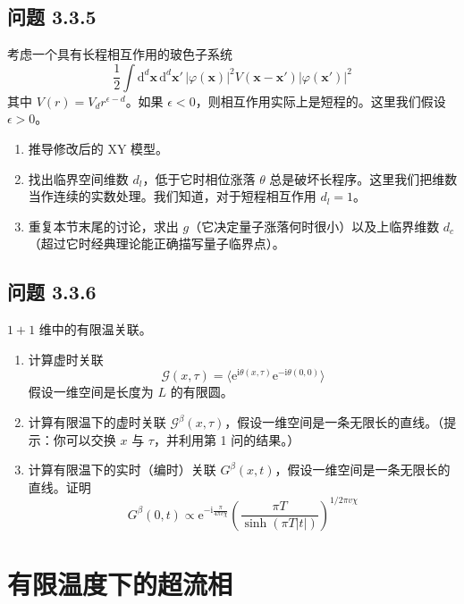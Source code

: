 \subsection*{问题 3.3.5}

考虑一个具有长程相互作用的玻色子系统
\begin{equation*}
\frac{1}{2}\int\mathrm{d}^d\pmb{x}\,\mathrm{d}^d\pmb{x}'\,|\varphi(\pmb{x})|^2V(\pmb{x}-\pmb{x}')|\varphi(\pmb{x}')|^2
\end{equation*}
其中 $V(r)=V_dr^{\epsilon-d}$。如果 $\epsilon<0$，则相互作用实际上是短程的。这里我们假设 $\epsilon>0$。
\begin{enumerate}
\item 推导修改后的 XY 模型。
\item 找出临界空间维数 $d_l$，低于它时相位涨落 $\theta$ 总是破坏长程序。这里我们把维数当作连续的实数处理。我们知道，对于短程相互作用 $d_l=1$。
\item 重复本节末尾的讨论，求出 $g$（它决定量子涨落何时很小）以及上临界维数 $d_c$（超过它时经典理论能正确描写量子临界点）。
\end{enumerate}

\subsection*{问题 3.3.6}

$1+1$ 维中的有限温关联。
\begin{enumerate}
\item 计算虚时关联
\begin{equation*}
\mathcal{G}(x,\tau)=\big\langle\mathrm{e}^{\mathrm{i}\theta(x,\tau)}\mathrm{e}^{-\mathrm{i}\theta(0,0)}\big\rangle
\end{equation*}
假设一维空间是长度为 $L$ 的有限圆。
\item 计算有限温下的虚时关联 $\mathcal{G}^{\beta}(x,\tau)$，假设一维空间是一条无限长的直线。（提示：你可以交换 $x$ 与 $\tau$，并利用第 1 问的结果。）
\item 计算有限温下的实时（编时）关联 $G^{\beta}(x,t)$，假设一维空间是一条无限长的直线。证明
\begin{equation*}
G^{\beta}(0,t)\propto\mathrm{e}^{-\mathrm{i}\frac{\pi}{4\pi v\chi}}\left(\frac{\pi T}{\sinh(\pi T|t|)}\right)^{1/2\pi v\chi}
\end{equation*}
\end{enumerate}

\section{有限温度下的超流相}

